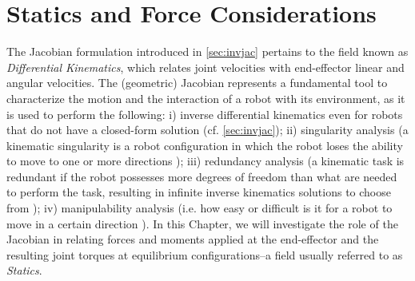 \chapter{Statics and Force Considerations}
\label{ch:forces}


The Jacobian formulation introduced in \cref{sec:invjac} pertains to the field known as \emph{Differential Kinematics}, which relates joint velocities with end-effector linear and angular velocities. The (geometric) Jacobian represents a fundamental tool to characterize the motion and the interaction of a robot with its environment, as it is used to perform the following:
  i) inverse differential kinematics even for robots that do not have a closed-form solution (cf. \cref{sec:invjac});
 ii) singularity analysis (a kinematic singularity is a robot configuration in which the robot loses the ability to move to one or more directions \cite{sciavicco2012modelling});
iii) redundancy analysis (a kinematic task is redundant if the robot possesses more degrees of freedom than what are needed to perform the task, resulting in infinite inverse kinematics solutions to choose from \cite{sciavicco2012modelling});
 iv) manipulability analysis (i.e. how easy or difficult is it for a robot to move in a certain direction \cite{sciavicco2012modelling}).
In this Chapter, we will investigate the role of the Jacobian in relating forces and moments applied at the end-effector and the resulting joint torques at equilibrium configurations--a field usually referred to as \emph{Statics}.
